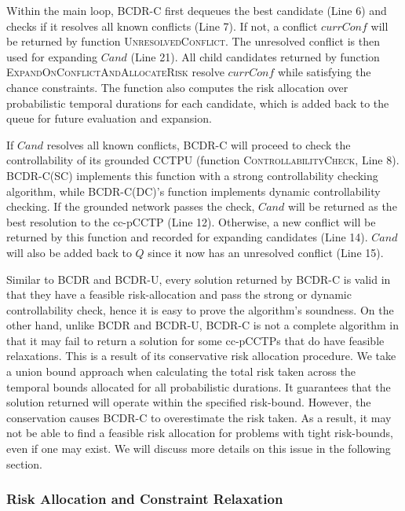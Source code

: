 \documentclass[jair,twoside,11pt,theapa]{article}
\begin{document}
Within the main loop, BCDR-C first dequeues the best candidate (Line 6) and
checks if it resolves all known conflicts (Line 7). If not, a conflict
$\mathit{currConf}$ will be returned by function \textsc{UnresolvedConflict}. The
unresolved conflict is then used for expanding $\mathit{Cand}$ (Line 21). All child
candidates returned by function \textsc{ExpandOnConflictAndAllocateRisk} resolve
$\mathit{currConf}$ while satisfying the chance constraints. The function also computes
the risk allocation over probabilistic temporal durations for each candidate,
which is added back to the queue for future evaluation and expansion.


If $\mathit{Cand}$ resolves all known conflicts, BCDR-C will proceed to check the
controllability of its grounded CCTPU (function \textsc{ControllabilityCheck},
Line 8). BCDR-C(SC) implements this function with a strong controllability checking algorithm, while BCDR-C(DC)'s function implements dynamic controllability checking. If the grounded network passes the check, $\mathit{Cand}$ will be returned as the best resolution to the
cc-pCCTP (Line 12). Otherwise, a new conflict will be returned by this function
and recorded for expanding candidates (Line 14). $\mathit{Cand}$ will also be added back
to $Q$ since it now has an unresolved conflict (Line 15).

Similar to BCDR and BCDR-U, every solution returned by BCDR-C is valid in that
they have a feasible risk-allocation and pass the strong or dynamic
controllability check, hence it is easy to prove the algorithm's soundness. On
the other hand, unlike BCDR and BCDR-U, BCDR-C is not a complete algorithm in
that it may fail to return a solution for some cc-pCCTPs that do have feasible
relaxations. This is a result of its conservative risk allocation procedure. We
take a union bound approach when calculating the total risk taken across the
temporal bounds allocated for all probabilistic durations. It guarantees that
the solution returned will operate within the specified risk-bound. However, the
conservation causes BCDR-C to overestimate the risk taken. As a result, it may
not be able to find a feasible risk allocation for problems with tight
risk-bounds, even if one may exist. We will discuss more details on this issue
in the following section.



\subsubsection{Risk Allocation and Constraint Relaxation}
\end{document}
